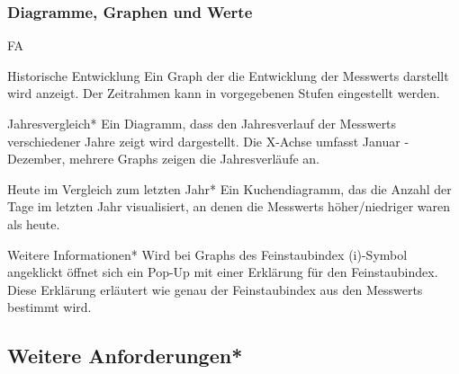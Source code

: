  \subsubsection*{Diagramme, Graphen und Werte}
 \begin{Kriterien}{FA}
  \item[Historische Entwicklung]
    Ein \gls{Graph} der die Entwicklung der \glspl{Messwert} darstellt wird anzeigt. Der Zeitrahmen kann in vorgegebenen Stufen 
    eingestellt werden.

  \item[Jahresvergleich*]
    Ein Diagramm, dass den Jahresverlauf der \glspl{Messwert} verschiedener Jahre zeigt wird dargestellt.
    Die X-Achse umfasst Januar - Dezember, mehrere \glspl{Graph} zeigen die Jahresverläufe an.

  \item[Heute im Vergleich zum letzten Jahr*]
    Ein \gls{Kuchendiagramm}, das die Anzahl der Tage im letzten Jahr visualisiert, an denen die \glspl{Messwert} höher/niedriger 
    waren als heute.

  \item[Weitere Informationen*]
    Wird bei \glspl{Graph} des \gls{Feinstaubindex} (i)-Symbol angeklickt öffnet sich ein \gls{Pop-Up} mit einer Erklärung für den 
    \gls{Feinstaubindex}.
    Diese Erklärung erläutert wie genau der \gls{Feinstaubindex} aus den \glspl{Messwert} bestimmt wird.
\end{Kriterien}


\subsection{Weitere Anforderungen*}

